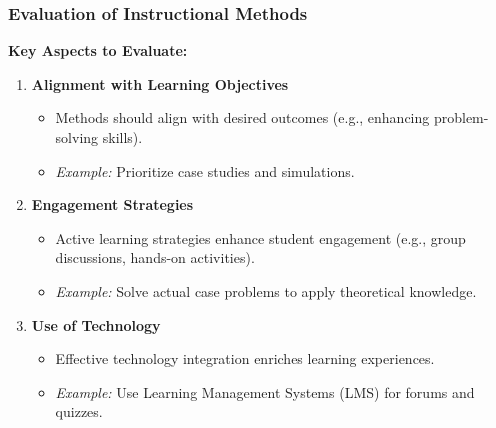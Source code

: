 \documentclass[aspectratio=169]{beamer}
\begin{document}
\begin{frame}[fragile]
    \frametitle{Evaluation of Instructional Methods}
    \textbf{Key Aspects to Evaluate:}
    \begin{enumerate}
        \item \textbf{Alignment with Learning Objectives}
            \begin{itemize}
                \item Methods should align with desired outcomes (e.g., enhancing problem-solving skills).
                \item \textit{Example:} Prioritize case studies and simulations.
            \end{itemize}
        
        \item \textbf{Engagement Strategies}
            \begin{itemize}
                \item Active learning strategies enhance student engagement (e.g., group discussions, hands-on activities).
                \item \textit{Example:} Solve actual case problems to apply theoretical knowledge.
            \end{itemize}
        
        \item \textbf{Use of Technology}
            \begin{itemize}
                \item Effective technology integration enriches learning experiences.
                \item \textit{Example:} Use Learning Management Systems (LMS) for forums and quizzes.
            \end{itemize}
    \end{enumerate}
\end{frame}
\end{document}
